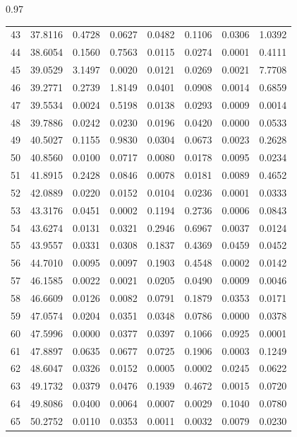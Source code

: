 \documentclass[../Thesis-IJspeert.tex]{subfiles}
\begin{document}
\begin{spacing}{0.97}
\begin{small}
\begin{longtable}{crrrrrrr}
			43 & 37.8116 & 0.4728 & 0.0627 & 0.0482 & 0.1106 & 0.0306 & 1.0392 \\  
			44 & 38.6054 & 0.1560 & 0.7563 & 0.0115 & 0.0274 & 0.0001 & 0.4111 \\  
			45 & 39.0529 & 3.1497 & 0.0020 & 0.0121 & 0.0269 & 0.0021 & 7.7708 \\  
			46 & 39.2771 & 0.2739 & 1.8149 & 0.0401 & 0.0908 & 0.0014 & 0.6859 \\  
			47 & 39.5534 & 0.0024 & 0.5198 & 0.0138 & 0.0293 & 0.0009 & 0.0014 \\  
			48 & 39.7886 & 0.0242 & 0.0230 & 0.0196 & 0.0420 & 0.0000 & 0.0533 \\  
			49 & 40.5027 & 0.1155 & 0.9830 & 0.0304 & 0.0673 & 0.0023 & 0.2628 \\  
			50 & 40.8560 & 0.0100 & 0.0717 & 0.0080 & 0.0178 & 0.0095 & 0.0234 \\  
			51 & 41.8915 & 0.2428 & 0.0846 & 0.0078 & 0.0181 & 0.0089 & 0.4652 \\  
			52 & 42.0889 & 0.0220 & 0.0152 & 0.0104 & 0.0236 & 0.0001 & 0.0333 \\  
			53 & 43.3176 & 0.0451 & 0.0002 & 0.1194 & 0.2736 & 0.0006 & 0.0843 \\  
			54 & 43.6274 & 0.0131 & 0.0321 & 0.2946 & 0.6967 & 0.0037 & 0.0124 \\  
			55 & 43.9557 & 0.0331 & 0.0308 & 0.1837 & 0.4369 & 0.0459 & 0.0452 \\  
			56 & 44.7010 & 0.0095 & 0.0097 & 0.1903 & 0.4548 & 0.0002 & 0.0142 \\  
			57 & 46.1585 & 0.0022 & 0.0021 & 0.0205 & 0.0490 & 0.0009 & 0.0046 \\  
			58 & 46.6609 & 0.0126 & 0.0082 & 0.0791 & 0.1879 & 0.0353 & 0.0171 \\  
			59 & 47.0574 & 0.0204 & 0.0351 & 0.0348 & 0.0786 & 0.0000 & 0.0378 \\  
			60 & 47.5996 & 0.0000 & 0.0377 & 0.0397 & 0.1066 & 0.0925 & 0.0001 \\  
			61 & 47.8897 & 0.0635 & 0.0677 & 0.0725 & 0.1906 & 0.0003 & 0.1249 \\  
			62 & 48.6047 & 0.0326 & 0.0152 & 0.0005 & 0.0002 & 0.0245 & 0.0622 \\  
			63 & 49.1732 & 0.0379 & 0.0476 & 0.1939 & 0.4672 & 0.0015 & 0.0720 \\  
			64 & 49.8086 & 0.0400 & 0.0064 & 0.0007 & 0.0029 & 0.1040 & 0.0780 \\  
			65 & 50.2752 & 0.0110 & 0.0353 & 0.0011 & 0.0032 & 0.0079 & 0.0230 \\  

\end{longtable}
\end{small}
\end{spacing}
\end{document}
